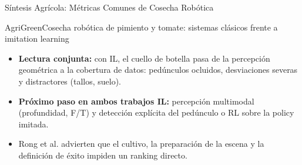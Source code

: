 \documentclass[aspectratio=169,10pt,xcolor={dvipsnames,table}]{beamer}
\begin{document}
\begin{frame}{Síntesis Agrícola: Métricas Comunes de Cosecha Robótica}
\begin{Card}{AgriGreen}{Cosecha robótica de pimiento y tomate: sistemas clásicos frente a imitation learning}
{\begin{itemize}
      \item[\textcolor{AgriGreen}{$\blacksquare$}] \textbf{Lectura conjunta:} con IL, el cuello de botella pasa de la percepción geométrica a la cobertura de datos: pedúnculos ocluidos, desviaciones severas y distractores (tallos, suelo).
      \item[\textcolor{AgriGreen}{$\blacksquare$}] \textbf{Próximo paso en ambos trabajos IL:} percepción multimodal (profundidad, F/T) y detección explícita del pedúnculo o RL sobre la policy imitada.
      \item[\textcolor{AgriGreen}{$\blacksquare$}] Rong et al. advierten que el cultivo, la preparación de la escena y la definición de éxito impiden un ranking directo.
    \end{itemize}}
  \end{Card}
\end{frame}
\end{document}
